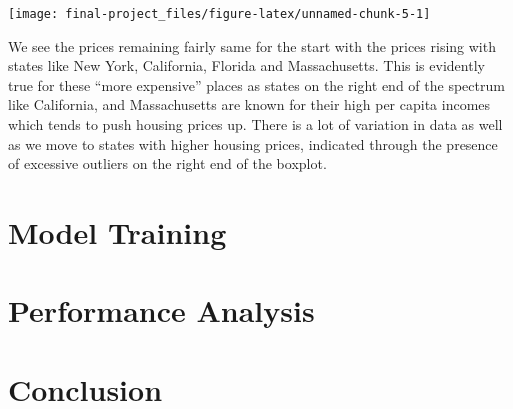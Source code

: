 \documentclass[
]{article}
\newenvironment{Shaded}{\begin{snugshade}}{\end{snugshade}}
\newcommand{\AttributeTok}[1]{\textcolor[rgb]{0.77,0.63,0.00}{#1}}
\newcommand{\DecValTok}[1]{\textcolor[rgb]{0.00,0.00,0.81}{#1}}
\newcommand{\FunctionTok}[1]{\textcolor[rgb]{0.00,0.00,0.00}{#1}}
\newcommand{\NormalTok}[1]{#1}
\newcommand{\SpecialCharTok}[1]{\textcolor[rgb]{0.00,0.00,0.00}{#1}}
\newcommand{\StringTok}[1]{\textcolor[rgb]{0.31,0.60,0.02}{#1}}
\begin{document}
\begin{Shaded}
\end{Shaded}

\begin{center}\texttt{[image: final-project\_files/figure-latex/unnamed-chunk-5-1]} \end{center}

We see the prices remaining fairly same for the start with the prices
rising with states like New York, California, Florida and Massachusetts.
This is evidently true for these ``more expensive'' places as states on
the right end of the spectrum like California, and Massachusetts are
known for their high per capita incomes which tends to push housing
prices up. There is a lot of variation in data as well as we move to
states with higher housing prices, indicated through the presence of
excessive outliers on the right end of the boxplot.

\hypertarget{model-training}{%
\section{Model Training}\label{model-training}}

\hypertarget{performance-analysis}{%
\section{Performance Analysis}\label{performance-analysis}}

\hypertarget{conclusion}{%
\section{Conclusion}\label{conclusion}}
\end{document}
